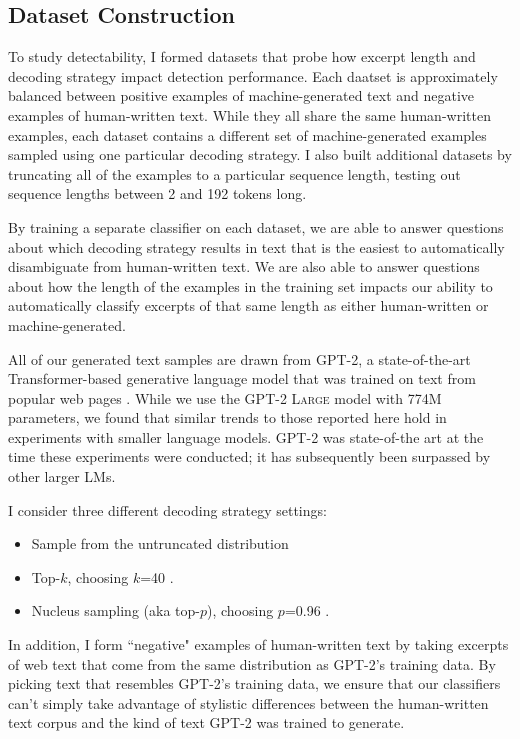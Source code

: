 \subsection{Dataset Construction}

To study detectability, I formed datasets that probe how excerpt length and decoding strategy impact detection performance. 
Each daatset is approximately balanced between positive examples of machine-generated text and negative examples of human-written text.
While they all share the same human-written examples, each dataset contains a different set of machine-generated examples sampled using one particular decoding strategy.
I also built additional datasets by truncating all of the examples to a particular sequence length, testing out sequence lengths between 2 and 192 tokens long.

By training a separate classifier on each dataset, we are able to answer questions about which decoding strategy results in text that is the easiest to automatically disambiguate from human-written text.
We are also able to answer questions about how the length of the examples in the training set impacts our ability to automatically classify excerpts of that same length as either human-written or machine-generated.

All of our generated text samples are drawn from GPT-2, a state-of-the-art Transformer-based generative language model that was trained on text from popular web pages \citep{radford2019language}.
While we use the GPT-2 \textsc{Large} model with 774M parameters, we found that similar trends to those reported here hold in experiments with smaller language models.
GPT-2 was state-of-the art at the time these experiments were conducted; it has subsequently been surpassed by other larger LMs.

I consider three different decoding strategy settings:
\begin{itemize}[noitemsep,topsep=0pt]
  \item Sample from the untruncated distribution
  \item Top-$k$, choosing $k$=40 \citep{radford2019language}.
  \item Nucleus sampling (aka top-$p$), choosing $p$=0.96 \citep{zellers2019defending}.
\end{itemize}

In addition, I form ``negative" examples of human-written text by taking excerpts of web text that come from the same distribution as GPT-2's training data.
By picking text that resembles GPT-2's training data, we ensure that our classifiers can't simply take advantage of stylistic differences between the human-written text corpus and the kind of text GPT-2 was trained to generate.

